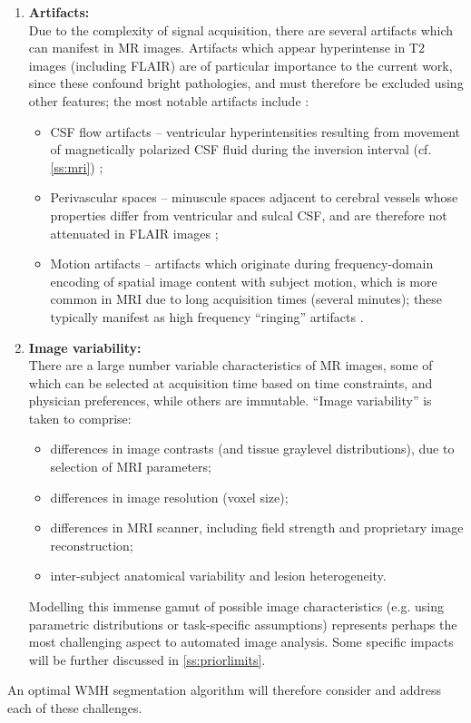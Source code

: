 \begin{enumerate}[itemsep=0pt,topsep=0pt]
  \item \label{chauto:artifacts}   \textbf{Artifacts:} \\
  Due to the complexity of signal acquisition, there are several artifacts which can manifest in MR images. Artifacts which appear hyperintense in T2 images (including FLAIR) are of particular importance to the current work, since these confound bright pathologies, and must therefore be excluded using other features; the most notable artifacts include \cite{Wardlaw2015}:
  \begin{itemize}[itemsep=0pt,topsep=0pt]
    \item CSF flow artifacts -- ventricular hyperintensities resulting from movement of magnetically polarized CSF fluid during the inversion interval (cf. \ref{ss:mri}) \cite{Bakshi2000};
    \item Perivascular spaces -- minuscule spaces adjacent to cerebral vessels whose properties differ from ventricular and sulcal CSF, and are therefore not attenuated in FLAIR images \cite{Wardlaw2015};
    \item Motion artifacts -- artifacts which originate during frequency-domain encoding of spatial image content with subject motion, which is more common in MRI due to long acquisition times (several minutes); these typically manifest as high frequency ``ringing'' artifacts \cite{Zaitsev2015}.
  \end{itemize}
  \item \label{chauto:variability} \textbf{Image variability:} \\
  There are a large number variable characteristics of MR images, some of which can be selected at acquisition time based on time constraints, and physician preferences, while others are immutable. ``Image variability'' is taken to comprise:
  \begin{itemize}[itemsep=0pt,topsep=0pt]
    \item differences in image contrasts (and tissue graylevel distributions), due to selection of MRI parameters;
    \item differences in image resolution (voxel size);
    \item differences in MRI scanner, including field strength and proprietary image reconstruction;
    \item inter-subject anatomical variability and lesion heterogeneity.
  \end{itemize}
  Modelling this immense gamut of possible image characteristics (e.g. using parametric distributions or task-specific assumptions) represents perhaps the most challenging aspect to automated image analysis. Some specific impacts will be further discussed in \ref{ss:priorlimits}.
\end{enumerate}
An optimal WMH segmentation algorithm will therefore consider and address each of these challenges.
